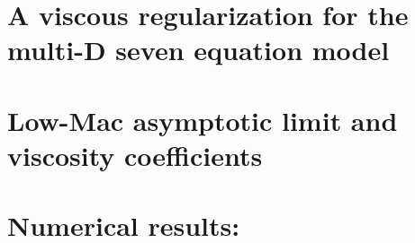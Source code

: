 \section{A viscous regularization for the multi-D seven equation model}\label{sec:sev-equ-visc-reg-sect4}
\section{Low-Mac asymptotic limit and viscosity coefficients}\label{sec:sev-equ-visc-coeff-sect4}
\section{Numerical results:}\label{sec:1d-num-res-sect4}

